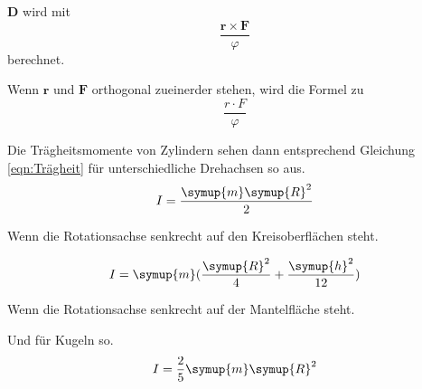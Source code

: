 $\symbf{D}$ wird mit
\begin{equation}
\frac{\symbf{r}\times \symbf{F}}{\varphi}
\label{eqn:D}
\end{equation}
berechnet.

Wenn $\symbf{r}$ und $\symbf{F}$ orthogonal zueinerder stehen, wird die Formel zu
\begin{equation}
    \frac{r \cdot F}{\varphi}
    \label{eqn:D2}
\end{equation}

Die Trägheitsmomente von Zylindern sehen dann entsprechend Gleichung \ref{eqn:Trägheit} für unterschiedliche
Drehachsen so aus.
\begin{equation}
    I=\frac{\symup{m}\symup{R}^2}{2} 
    \label{eqn:Trägheit_Zyl_1} 
\end{equation}
    \begin{center} 
    Wenn die Rotationsachse senkrecht auf den Kreisoberflächen steht.
    \end{center}
\begin{equation}
    I=\symup{m} (\frac{\symup{R}^2}{4}+\frac{\symup{h}^2}{12}) 
    \label{eqn:Trägheit_Zyl_2}  
\end{equation}
\begin{center}   
    Wenn die Rotationsachse senkrecht auf der Mantelfläche steht.
\end{center}

Und für Kugeln so.
\begin{equation}
    I=\frac{2}{5}\symup{m}\symup{R}^2
    \label{eqn:Trägheit_Kugel}
\end{equation}
